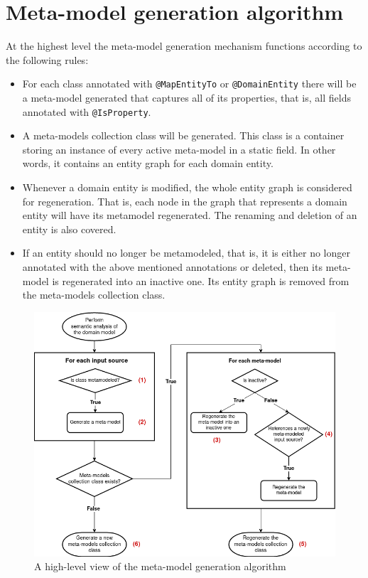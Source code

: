 \section{Meta-model generation algorithm}
At the highest level the meta-model generation mechanism functions according to the following rules:
\begin{itemize}
    \item For each class annotated with \texttt{@MapEntityTo} or \texttt{@DomainEntity} there will be a meta-model generated that captures all of its properties, that is, all fields annotated with \texttt{@IsProperty}.
    \item A meta-models collection class will be generated.
        This class is a container storing an instance of every active meta-model in a static field.
        In other words, it contains an entity graph for each domain entity.
    \item Whenever a domain entity is modified, the whole entity graph is considered for regeneration.
        That is, each node in the graph that represents a domain entity will have its metamodel regenerated.
        The renaming and deletion of an entity is also covered.
    \item If an entity should no longer be metamodeled, that is, it is either no longer annotated with the above mentioned annotations or deleted, then its meta-model is regenerated into an inactive one.
        Its entity graph is removed from the meta-models collection class.
\end{itemize}


\begin{figure}[H]\centering
    \includegraphics[scale=0.55]{images/algorithm.drawio.png}
    \caption{A high-level view of the meta-model generation algorithm}\label{fig:algorithm}
\end{figure}

